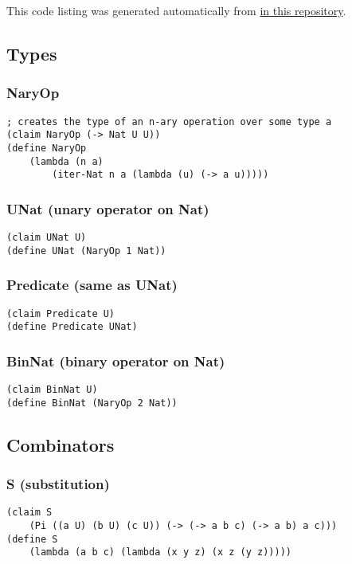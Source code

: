 This code listing was generated automatically from \href{https://github.com/thechosenreader/The-Little-Typer-Notes}{ in this repository}.
\subsection{Types}

\subsubsection{NaryOp} \label{code:NaryOp}
\begin{verbatim}
; creates the type of an n-ary operation over some type a
(claim NaryOp (-> Nat U U))
(define NaryOp
    (lambda (n a)
        (iter-Nat n a (lambda (u) (-> a u)))))
\end{verbatim}

\subsubsection{UNat (unary operator on Nat)} \label{code:UNat}
\begin{verbatim}
(claim UNat U)
(define UNat (NaryOp 1 Nat))
\end{verbatim}

\subsubsection{Predicate (same as UNat)} \label{code:Predicate}
\begin{verbatim}
(claim Predicate U)
(define Predicate UNat)
\end{verbatim}

\subsubsection{BinNat (binary operator on Nat)} \label{code:BinNat}
\begin{verbatim}
(claim BinNat U)
(define BinNat (NaryOp 2 Nat))
\end{verbatim}


\subsection{Combinators}

\subsubsection{S (substitution)} \label{code:S}
\begin{verbatim}
(claim S
    (Pi ((a U) (b U) (c U)) (-> (-> a b c) (-> a b) a c)))
(define S
    (lambda (a b c) (lambda (x y z) (x z (y z)))))
\end{verbatim}

